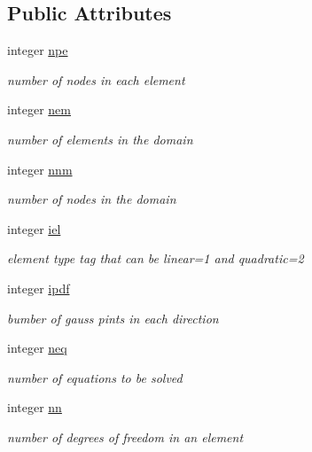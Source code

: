 \subsection*{Public Attributes}
\begin{DoxyCompactItemize}
\item 
integer \hyperlink{classfem__geometry_a797a070f41b998f78b389259c438b7f1}{npe}
\begin{DoxyCompactList}\small\item\em number of nodes in each element \end{DoxyCompactList}\item 
integer \hyperlink{classfem__geometry_a25c1889eff70cf93eadef0a100d29bd1}{nem}
\begin{DoxyCompactList}\small\item\em number of elements in the domain \end{DoxyCompactList}\item 
integer \hyperlink{classfem__geometry_a4c0e808cd5fe275c9614921b55877bec}{nnm}
\begin{DoxyCompactList}\small\item\em number of nodes in the domain \end{DoxyCompactList}\item 
integer \hyperlink{classfem__geometry_ac37a04b723d229689bc13db9a32a20c7}{iel}
\begin{DoxyCompactList}\small\item\em element type tag that can be linear=1 and quadratic=2 \end{DoxyCompactList}\item 
integer \hyperlink{classfem__geometry_affb4f5c597a449d349b7c10cb73c1d12}{ipdf}
\begin{DoxyCompactList}\small\item\em bumber of gauss pints in each direction \end{DoxyCompactList}\item 
integer \hyperlink{classfem__geometry_abccad0a217818ea3bfb8ae3774704842}{neq}
\begin{DoxyCompactList}\small\item\em number of equations to be solved \end{DoxyCompactList}\item 
integer \hyperlink{classfem__geometry_a4c5fb53d974372ee3cb13d85dbd26800}{nn}
\begin{DoxyCompactList}\small\item\em number of degrees of freedom in an element \end{DoxyCompactList}\item 

\end{DoxyCompactItemize}
